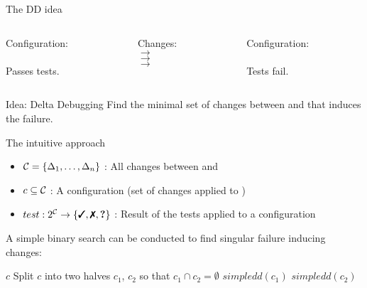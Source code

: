 \begin{frame}{The DD idea}
	\begin{columns}
		\begin{column}{0.4\textwidth}
			\begin{center}
			Configuration:\\[2em]

			\yd\\[1em]
			Passes tests. \green{\cmark}
			\end{center}
		\end{column}
		\begin{column}{0.2\textwidth}
			\begin{center}
			Changes:\\[1.5em]
			$\longrightarrow$ \\
			$\longrightarrow$ \\
			$\longrightarrow$ \\
			\end{center}
			
		\end{column}
		\begin{column}{0.4\textwidth}
			\begin{center}	
			Configuration:\\[2em]

			\td\\[1em]
			Tests fail. \red{\xmark}
			\end{center}
		\end{column}
	\end{columns}

	\bigskip

	\begin{exampleblock}{Idea: Delta Debugging}
		Find the minimal set of changes between \yd and \td that induces the failure.
	\end{exampleblock}
\end{frame}

\begin{frame}{The intuitive approach}
	\begin{itemize}
		\item $\mathcal{C} = \left\{ \Delta_1, \dots, \Delta_n \right\}$ : All changes between \yd and \td
		\item $c \subseteq \mathcal{C}$ : A configuration (set of changes applied to \yd)
		\item $test: 2^{\C} \to \set{\cmark,\xmark,\qmark}$ : Result of the tests applied to a configuration
	\end{itemize}
	
	\bigskip

	A simple binary search can be conducted to find singular failure inducing changes:\\[.5em]

	\begin{algorithmic}[1]
			 \Return $c$ \EndIf
			\State Split $c$ into two halves $c_1$, $c_2$ so that $c_1 \cap c_2 = \emptyset$
			 \Return $simpledd(c_1)$ \Else{} \Return $simpledd(c_2)$
			\EndIf
		\EndFunction
	\end{algorithmic}
\end{frame}

